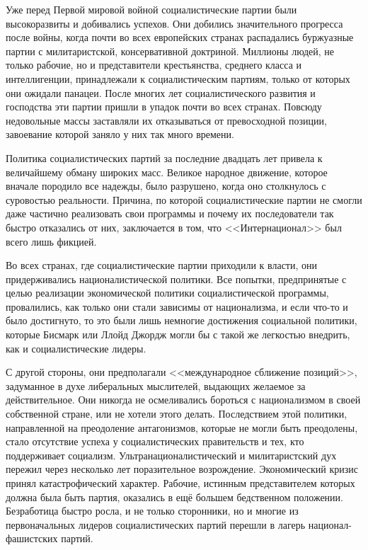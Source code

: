 Уже перед Первой мировой войной социалистические партии были высокоразвиты и добивались успехов. Они добились значительного прогресса после войны, когда почти во всех европейских странах распадались буржуазные партии с милитаристской, консервативной доктриной. Миллионы людей, не только рабочие, но и представители крестьянства, среднего класса и интеллигенции, принадлежали к социалистическим партиям, только от которых они ожидали панацеи. После многих лет социалистического развития и господства эти партии пришли в упадок почти во всех странах. Повсюду недовольные массы заставляли их отказываться от превосходной позиции, завоевание которой заняло у них так много времени.

Политика социалистических партий за последние двадцать лет привела к величайшему обману широких масс. Великое народное движение, которое вначале породило все надежды, было разрушено, когда оно столкнулось с суровостью реальности. Причина, по которой социалистические партии не смогли даже частично реализовать свои программы и почему их последователи так быстро отказались от них, заключается в том, что <<Интернационал>> был всего лишь фикцией.

Во всех странах, где социалистические партии приходили к власти, они придерживались националистической политики. Все попытки, предпринятые с целью реализации экономической политики социалистической программы, провалились, как только они стали зависимы от национализма, и если что-то и было достигнуто, то это были лишь немногие достижения социальной политики, которые Бисмарк или Ллойд Джордж могли бы с такой же легкостью внедрить, как и социалистические лидеры.

С другой стороны, они предполагали <<международное сближение позиций>>, задуманное в духе либеральных мыслителей, выдающих желаемое за действительное. Они никогда не осмеливались бороться с национализмом в своей собственной стране, или не хотели этого делать. Последствием этой политики, направленной на преодоление антагонизмов, которые не могли быть преодолены, стало отсутствие успеха у социалистических правительств и тех, кто поддерживает социализм. Ультранационалистический и милитаристский дух пережил через несколько лет поразительное возрождение. Экономический кризис принял катастрофический характер. Рабочие, истинным представителем которых должна была быть партия, оказались в ещё большем бедственном положении. Безработица быстро росла, и не только сторонники, но и многие из первоначальных лидеров социалистических партий перешли в лагерь национал-фашистских партий.


